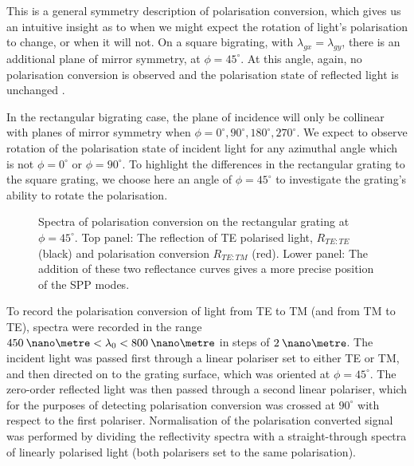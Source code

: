 This is a general symmetry description of polarisation conversion, which gives us an intuitive insight as to when we might expect the rotation of light's polarisation to change, or when it will not. On a square bigrating, with $\lambda_{gx}=\lambda_{gy}$, there is an additional plane of mirror symmetry, at $\phi=45^\circ$. At this angle, again, no polarisation conversion is observed and the polarisation state of reflected light is unchanged \cite{Sabat2010}.

In the rectangular bigrating case, the plane of incidence will only be collinear with planes of mirror symmetry when $\phi=0^\circ, 90^\circ,180^\circ, 270^\circ$. We expect to observe rotation of the polarisation state of incident light for any azimuthal angle which is not $\phi=0^\circ$ or $\phi=90^\circ$. To highlight the differences in the rectangular grating to the square grating, we choose here an angle of $\phi=45^\circ$ to investigate the grating's ability to rotate the polarisation. 

\begin{figure}
\begin{center}

\end{center}
\caption[Spectra of polarisation conversion on the rectangular grating at $\phi=45^\circ$.]{Spectra of polarisation conversion on the rectangular grating at $\phi=45^\circ$. Top panel: The reflection of TE polarised light, $R_{TE:TE}$ (black) and polarisation conversion $R_{TE:TM}$ (red). Lower panel: The addition of these two reflectance curves gives a more precise position of the SPP modes.\label{fig:rectpolconv}}
\end{figure}

To record the polarisation conversion of light from TE to TM (and from TM to TE), spectra were recorded in the range $450\:\nano\metre<\lambda_0<800\:\nano\metre$ in steps of $2\:\nano\metre$. The incident light was passed first through a linear polariser set to either TE or TM, and then directed on to the grating surface, which was oriented at $\phi=45^\circ$. The zero-order reflected light was then passed through a second linear polariser, which for the purposes of detecting polarisation conversion was crossed at $90^\circ$ with respect to the first polariser. Normalisation of the polarisation converted signal was performed by dividing the reflectivity spectra with a straight-through spectra of linearly polarised light (both polarisers set to the same polarisation).

